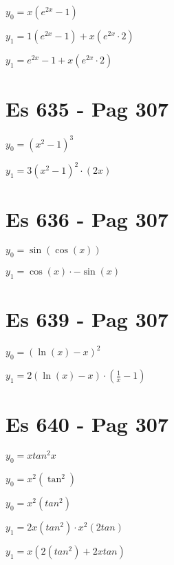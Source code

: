 \documentclass[11pt]{article}
\begin{document}
$ y_0 = x(e^{2x} - 1) $

$ y_1 = 1(e^{2x} - 1) + x(e^{2x} \cdot 2) $

$ y_1 = e^{2x} - 1 + x(e^{2x} \cdot 2) $

\section{Es 635 - Pag 307}

$ y_0 = (x^2 - 1)^3 $

$ y_1 = 3(x^2 - 1)^2 \cdot (2x)$

\section{Es 636 - Pag 307}

$ y_0 = \sin(\cos(x)) $

$ y_1 = \cos(x) \cdot -\sin(x) $

\section{Es 639 - Pag 307}

$ y_0 = (\ln(x) - x)^2 $

$ y_1 = 2(\ln(x) - x) \cdot (\frac{1}{x} - 1) $

\section{Es 640 - Pag 307}

$ y_0 = xtan^2x $

$ y_0 = x^2(\tan^2) $

$ y_0 = x^2(tan^2) $

$ y_1 = 2x(tan^2) \cdot x^2(2tan) $

$ y_1 = x(2(tan^2) + 2xtan)$


\pagebreak
\end{document}
